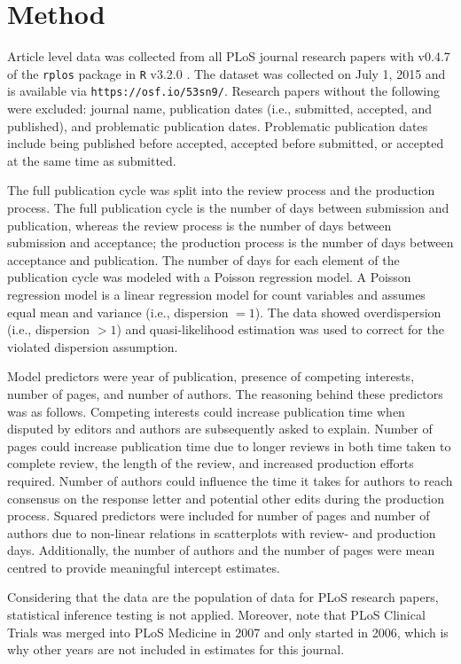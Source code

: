 \section*{Method}
Article level data was collected from all PLoS journal research papers with v0.4.7 of the \texttt{rplos} package \cite{rplos} in \texttt{R} v3.2.0 \cite{rcran}. The dataset was collected on July 1, 2015 and is available via \texttt{https://osf.io/53sn9/}. Research papers without the following were excluded: journal name, publication dates (i.e., submitted, accepted, and published), and problematic publication dates. Problematic publication dates include being published before accepted, accepted before submitted, or accepted at the same time as submitted.

The full publication cycle was split into the review process and the production process. The full publication cycle is the number of days between submission and publication, whereas the review process is the number of days between submission and acceptance; the production process is the number of days between acceptance and publication. The number of days for each element of the publication cycle was modeled with a Poisson regression model. A Poisson regression model is a linear regression model for count variables and assumes equal mean and variance (i.e., dispersion $=1$). The data showed overdispersion (i.e., dispersion $>1$) and quasi-likelihood estimation was used to correct for the violated dispersion assumption.

Model predictors were year of publication, presence of competing interests, number of pages, and number of authors. The reasoning behind these predictors was as follows. Competing interests could increase publication time when disputed by editors and authors are subsequently asked to explain. Number of pages could increase publication time due to longer reviews in both time taken to complete review, the length of the review, and increased production efforts required. Number of authors could influence the time it takes for authors to reach consensus on the response letter and potential other edits during the production process. Squared predictors were included for number of pages and number of authors due to non-linear relations in scatterplots with review- and production days. Additionally, the number of authors and the number of pages were mean centred to provide meaningful intercept estimates.

Considering that the data are the population of data for PLoS research papers, statistical inference testing is not applied. Moreover, note that PLoS Clinical Trials was merged into PLoS Medicine in 2007 and only started in 2006, which is why other years are not included in estimates for this journal.
  